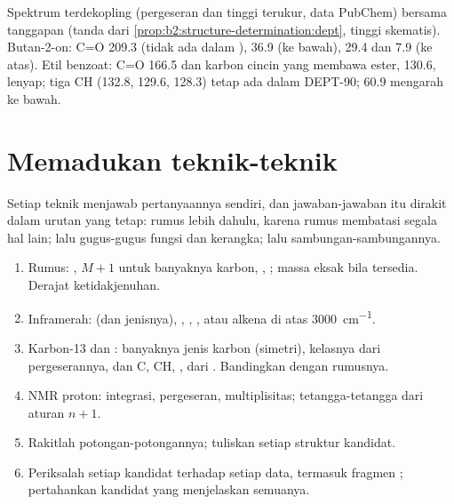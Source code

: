 \begin{omfigure}
{\small Spektrum  terdekopling (pergeseran dan tinggi terukur,
data PubChem) bersama tanggapan  (tanda dari
\cref{prop:b2:structure-determination:dept}, tinggi skematis). Butan-2-on:
C=O 209.3 (tidak ada dalam ),  36.9 (ke bawah),  29.4
dan 7.9 (ke atas). Etil benzoat: C=O 166.5 dan karbon cincin yang membawa
ester, 130.6, lenyap; tiga CH  (132.8, 129.6, 128.3) tetap ada
dalam DEPT-90;  60.9 mengarah ke bawah.}
\end{omfigure}

\section{Memadukan teknik-teknik}

Setiap teknik menjawab pertanyaannya sendiri, dan jawaban-jawaban itu
dirakit dalam urutan yang tetap: rumus lebih dahulu, karena rumus membatasi
segala hal lain; lalu gugus-gugus fungsi dan kerangka; lalu
sambungan-sambungannya.

\begin{method}\label{met:b2:structure-determination:solve}
\begin{enumerate}
  \item Rumus: , $M+1$ untuk banyaknya karbon, ,
        ; massa eksak bila tersedia. Derajat
        ketidakjenuhan.
  \item Inframerah:  (dan jenisnya), , , ,
          atau alkena di atas \qty{3000}{cm^{-1}}.
  \item Karbon-13 dan : banyaknya jenis karbon (simetri), kelasnya dari
        pergeserannya, dan C, CH, ,  dari . Bandingkan
        dengan rumusnya.
  \item NMR proton: integrasi, pergeseran, multiplisitas; tetangga-tetangga
        dari aturan $n + 1$.
  \item Rakitlah potongan-potongannya; tuliskan setiap struktur kandidat.
  \item Periksalah setiap kandidat terhadap setiap data, termasuk fragmen
        ; pertahankan kandidat yang menjelaskan semuanya.
\end{enumerate}
\end{method}

